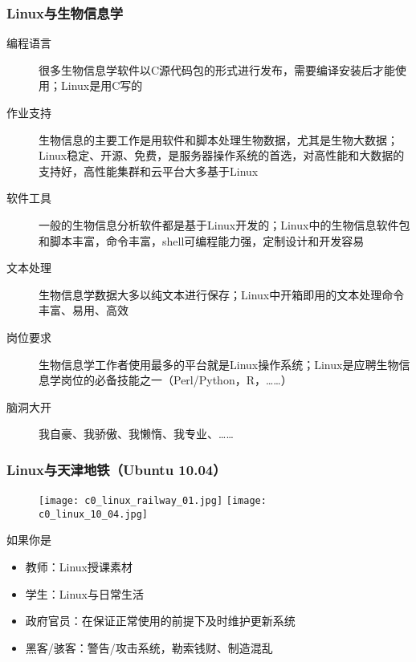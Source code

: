 \begin{frame}
\end{frame}

\begin{frame}
  \frametitle{Linux与生物信息学}
  \begin{description}
    \item[编程语言] 很多生物信息学软件以C源代码包的形式进行发布，需要编译安装后才能使用；Linux是用C写的
    \item[作业支持] 生物信息的主要工作是用软件和脚本处理生物数据，尤其是生物大数据；Linux稳定、开源、免费，是服务器操作系统的首选，对高性能和大数据的支持好，高性能集群和云平台大多基于Linux
    \item[软件工具] 一般的生物信息分析软件都是基于Linux开发的；Linux中的生物信息软件包和脚本丰富，命令丰富，shell可编程能力强，定制设计和开发容易
    \item[文本处理] 生物信息学数据大多以纯文本进行保存；Linux中开箱即用的文本处理命令丰富、易用、高效
    \item[岗位要求] 生物信息学工作者使用最多的平台就是Linux操作系统；Linux是应聘生物信息学岗位的必备技能之一（Perl/Python，R，……）
    \item[脑洞大开] 我自豪、我骄傲、我懒惰、我专业、……
  \end{description}
\end{frame}

\begin{frame}
  \frametitle{Linux与天津地铁（Ubuntu 10.04）}
  \begin{figure}
    \centering
    \texttt{[image: c0\_linux\_railway\_01.jpg]}\quad
    \texttt{[image: c0\_linux\_10\_04.jpg]}
  \end{figure}
  \pause
  \begin{block}{如果你是}
    \begin{itemize}
      \item 教师：Linux授课素材
      \item 学生：Linux与日常生活
      \item 政府官员：在保证正常使用的前提下及时维护更新系统
      \item 黑客/骇客：警告/攻击系统，勒索钱财、制造混乱
    \end{itemize}
  \end{block}
\end{frame}

